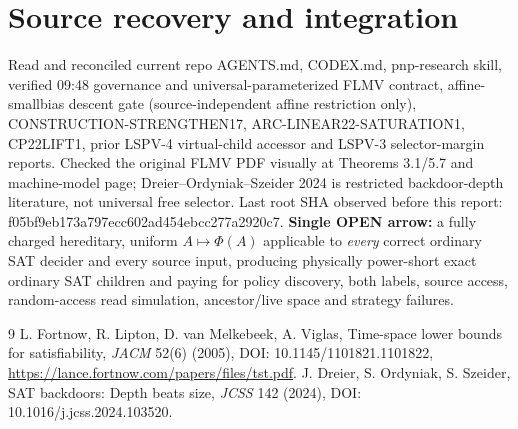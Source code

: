 \documentclass[10pt]{article}
\begin{document}
\section{Source recovery and integration}
Read and reconciled current repo AGENTS.md, CODEX.md, pnp-research skill, verified 09:48 governance and universal-parameterized FLMV contract, affine-smallbias descent gate (source-independent affine restriction only), CONSTRUCTION-STRENGTHEN17, ARC-LINEAR22-SATURATION1, CP22LIFT1, prior LSPV-4 virtual-child accessor and LSPV-3 selector-margin reports. Checked the original FLMV PDF visually at Theorems 3.1/5.7 and machine-model page; Dreier--Ordyniak--Szeider 2024 is restricted backdoor-depth literature, not universal free selector. Last root SHA observed before this report: f05bf9eb173a797ecc602ad454ebcc277a2920c7.
\noindent\textbf{Single OPEN arrow:} a fully charged hereditary, uniform $A\mapsto\Phi(A)$ applicable to \emph{every} correct ordinary SAT decider and every source input, producing physically power-short exact ordinary SAT children and paying for policy discovery, both labels, source access, random-access read simulation, ancestor/live space and strategy failures.

\begin{thebibliography}{9}
 L. Fortnow, R. Lipton, D. van Melkebeek, A. Viglas, Time-space lower bounds for satisfiability, \emph{JACM} 52(6) (2005), DOI: 10.1145/1101821.1101822, \url{https://lance.fortnow.com/papers/files/tst.pdf}.
 J. Dreier, S. Ordyniak, S. Szeider, SAT backdoors: Depth beats size, \emph{JCSS} 142 (2024), DOI: 10.1016/j.jcss.2024.103520.
\end{thebibliography}
\end{document}
